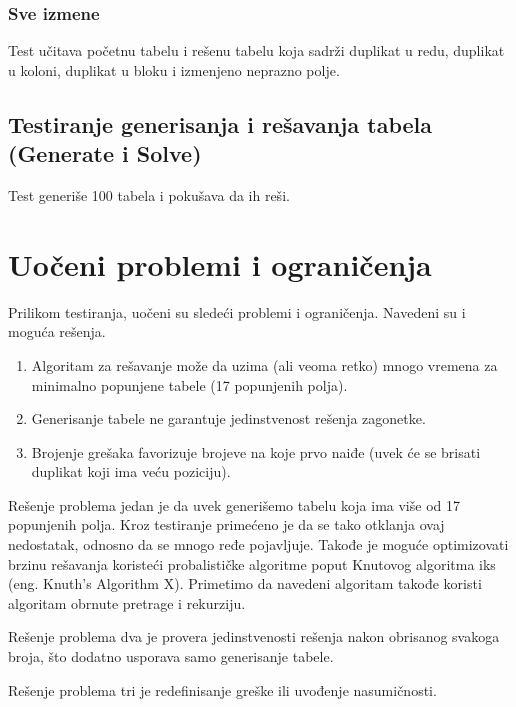 \documentclass[a4paper]{article}
\begin{document}
    \subsubsection{Sve izmene}
    Test učitava početnu tabelu i rešenu tabelu koja sadrži duplikat u redu, duplikat u koloni, duplikat u bloku i izmenjeno neprazno polje.
    \subsection{Testiranje generisanja i rešavanja tabela (Generate i Solve)}
    Test generiše 100 tabela i pokušava da ih reši.

    \newpage
    \section{Uočeni problemi i ograničenja}
    Prilikom testiranja, uočeni su sledeći problemi i ograničenja. Navedeni su i moguća rešenja.
    \begin{enumerate}
        \item Algoritam za rešavanje može da uzima (ali veoma retko) mnogo vremena za minimalno popunjene tabele (17 popunjenih polja).
        \item Generisanje tabele ne garantuje jedinstvenost rešenja zagonetke.
        \item Brojenje grešaka favorizuje brojeve na koje prvo naiđe (uvek će se brisati duplikat koji ima veću poziciju).
    \end{enumerate}
    \par Rešenje problema jedan je da uvek generišemo tabelu koja ima više od 17 popunjenih polja. Kroz testiranje primećeno je da se tako otklanja ovaj nedostatak, odnosno da se
    mnogo ređe pojavljuje. Takođe je moguće optimizovati brzinu rešavanja koristeći probalističke algoritme poput Knutovog algoritma iks (eng. Knuth's Algorithm X). Primetimo da navedeni algoritam
    takođe koristi algoritam obrnute pretrage i rekurziju.
    \par Rešenje problema dva je provera jedinstvenosti rešenja nakon obrisanog svakoga broja, što dodatno usporava samo generisanje tabele.
    \par Rešenje problema tri je redefinisanje greške ili uvođenje nasumičnosti.
    \newpage
\end{document}
